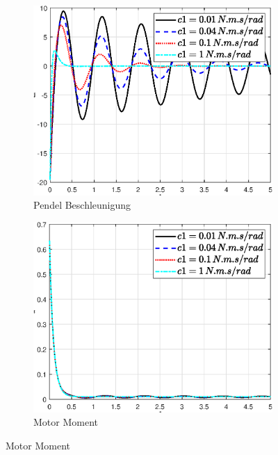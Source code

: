 \begin{figure}
\begin{subfigure}[b]{0.49 \linewidth}
        \label{fig:c1_phi_punkt_punkt}
    \end{subfigure}
    \begin{subfigure}[b]{0.49 \linewidth}
        \includegraphics[width=\linewidth]{Bilder/5_sensi/fig/c1/theta_punkt_punkt.eps}
        \caption{Pendel Beschleunigung}
        \label{fig:c1_theta_punkt_punkt}
    \end{subfigure}
    \begin{subfigure}[b]{0.49\linewidth}
        \includegraphics[width=\linewidth]{Bilder/5_sensi/fig/c1/tau.eps}
        \caption{Motor Moment}
        \label{fig:c1_tau}
    \end{subfigure}

\end{figure}
